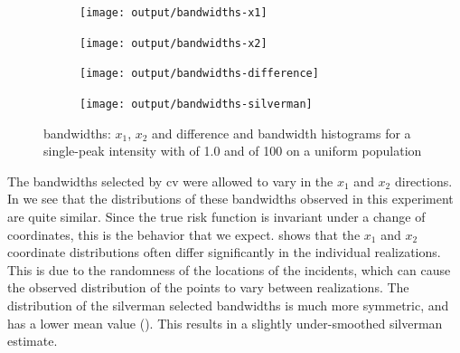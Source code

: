 \begin{figure}[htbp]
    \centering
    \begin{subfigure}[t]{0.45\textwidth}
        \texttt{[image: output/bandwidths-x1]}
        \label{fig:bandwidths:unif_100_1.0_1h:x1}
    \end{subfigure}
    \begin{subfigure}[t]{0.45\textwidth}
        \texttt{[image: output/bandwidths-x2]}
        \label{fig:bandwidths:unif_100_1.0_1h:x2}
    \end{subfigure}

    \begin{subfigure}[t]{0.45\textwidth}
        \texttt{[image: output/bandwidths-difference]}
        \label{fig:bandwidths:unif_100_1.0_1h:diff}
    \end{subfigure}
    \begin{subfigure}[t]{0.45\textwidth}
        \texttt{[image: output/bandwidths-silverman]}
        \label{fig:bandwidths:unif_100_1.0_1h:silverman}
    \end{subfigure}
    \caption[Bandwidths: Single-peak of 100 on uniform population]{ bandwidths: $x_1$, $x_2$ and difference and  bandwidth histograms for  a single-peak intensity with  of 1.0 and  of 100 on a uniform population}
    \label{fig:bandwidths:unif_100_1.0_1h}
\end{figure}

The bandwidths selected by \gls{cv} were allowed to vary in the $x_1$ and $x_2$ directions.
In  we see that the distributions of these bandwidths observed in this experiment are quite similar.
Since the true \gls{risk} function is invariant under a change of coordinates,
this is the behavior that we expect.
 shows that the $x_1$ and $x_2$ coordinate distributions often differ significantly in the individual realizations.
This is due to the randomness of the locations of the \glspl{incident},
which can cause the observed distribution of the points to vary between realizations.
The distribution of the \gls{silverman} selected bandwidths is much more symmetric, and has a lower mean value ().
This results in a slightly under-smoothed \gls{silverman} estimate.

